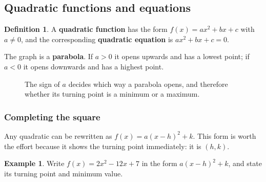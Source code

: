 \documentclass[11pt,a4paper]{article}
\theoremstyle{definition}
\newtheorem{definition}[thm]{Definition}
\newtheorem{example}[thm]{Example}
\begin{document}
\subsection{Quadratic functions and equations}

\begin{definition}
A \textbf{quadratic function} has the form $f(x)=ax^2+bx+c$ with $a\neq 0$, and the
corresponding \textbf{quadratic equation} is $ax^2+bx+c=0$.
\end{definition}

The graph is a \textbf{parabola}. If $a>0$ it opens upwards and has a lowest point; if
$a<0$ it opens downwards and has a highest point.

\begin{figure}[H]
\centering
{}
\caption{The sign of $a$ decides which way a parabola opens, and therefore whether its turning point is a minimum or a maximum.}
\end{figure}

\subsubsection{Completing the square}

Any quadratic can be rewritten as $f(x)=a(x-h)^2+k$. This form is worth the effort
because it shows the turning point immediately: it is $(h,k)$.

\begin{example}
Write $f(x)=2x^2-12x+7$ in the form $a(x-h)^2+k$, and state its turning point and
minimum value.
\end{example}
\end{document}
